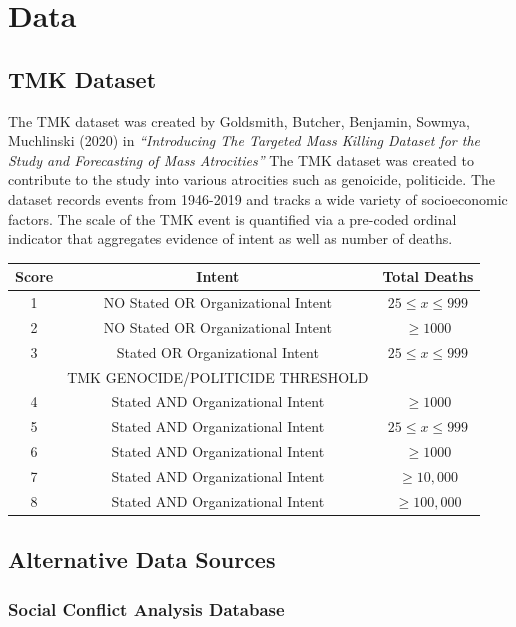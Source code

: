 \chapter{Data}\label{ch:style}

\section{TMK Dataset}
The TMK dataset was created by Goldsmith, Butcher, Benjamin, Sowmya, Muchlinski (2020) in  \emph{“Introducing The Targeted Mass Killing Dataset for the Study and Forecasting of Mass Atrocities”}
The TMK dataset was created to contribute to the study into various atrocities such as genoicide, politicide. The dataset records events from 1946-2019 and tracks a wide variety of socioeconomic factors. The scale of the TMK event is quantified via a pre-coded ordinal indicator that aggregates evidence of intent as well as number of deaths.

\begin{center}
 \begin{tabular}{||c c c||} 
 \hline
 Score & Intent & Total Deaths\\ [1ex] 
 \hline
 1 & NO Stated OR Organizational Intent & $25 \leq x \leq 999$ \\ [1ex] 
 \hline
 2 & NO Stated OR Organizational Intent &  $\geq 1000$  \\ [1ex] 
 \hline
 3 & Stated OR Organizational Intent & $25 \leq x \leq 999$ \\ [1ex]  
 \hline
  & TMK GENOCIDE/POLITICIDE THRESHOLD & \\
 \hline
 4 & Stated AND Organizational Intent  &  $\geq 1000$  \\ [1ex] 
 \hline
  5 & Stated AND Organizational Intent  & $25 \leq x \leq 999$  \\ [1ex] 
 \hline
  6 & Stated AND Organizational Intent  &  $\geq 1000$   \\ [1ex] 
 \hline
  7 & Stated AND Organizational Intent  &  $\geq 10,000$   \\ [1ex] 
 \hline
  8 & Stated AND Organizational Intent  &  $\geq 100,000$   \\ [1ex] 
 \hline
\end{tabular}
\end{center}

\section{Alternative Data Sources}
\subsection{Social Conflict Analysis Database}
